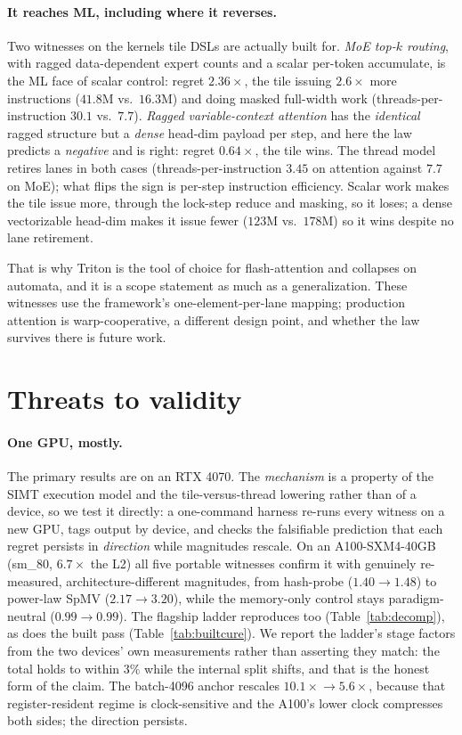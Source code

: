 \documentclass[sigplan,screen,review,anonymous]{acmart}
\begin{document}
\paragraph{It reaches ML, including where it reverses.} Two witnesses on the kernels tile
DSLs are actually built for. \emph{MoE top-$k$ routing}, with ragged data-dependent expert
counts and a scalar per-token accumulate, is the ML face of scalar control: regret
$2.36\times$, the tile issuing $2.6\times$ more instructions ($41.8$M vs.\ $16.3$M) and
doing masked full-width work (threads-per-instruction $30.1$ vs.\ $7.7$).
\emph{Ragged variable-context attention} has the \emph{identical} ragged structure but a
\emph{dense} head-dim payload per step, and here the law predicts a \emph{negative} and is
right: regret $0.64\times$, the tile wins. The thread model retires lanes in both cases
(threads-per-instruction $3.45$ on attention against $7.7$ on MoE); what flips the sign is
per-step instruction efficiency. Scalar work makes the tile issue
more, through the lock-step reduce and masking, so it loses; a dense vectorizable head-dim
makes it issue fewer ($123$M vs.\ $178$M) so it wins despite no lane retirement.

That is why Triton is the tool of choice for flash-attention and collapses on automata, and
it is a scope statement as much as a generalization. These witnesses use the framework's
one-element-per-lane mapping; production attention is warp-cooperative, a different design
point, and whether the law survives there is future work.

\section{Threats to validity}\label{sec:threats}

\paragraph{One GPU, mostly.} The primary results are on an RTX 4070. The \emph{mechanism}
is a property of the SIMT execution model and the tile-versus-thread lowering rather than
of a device, so we test it directly: a one-command harness re-runs every witness on a new
GPU, tags output by device, and checks the falsifiable prediction that each regret persists
in \emph{direction} while magnitudes rescale. On an A100-SXM4-40GB (sm\_80, $6.7\times$ the
L2) all five portable witnesses confirm it with genuinely re-measured, architecture-different
magnitudes, from hash-probe ($1.40\!\to\!1.48$) to power-law SpMV
($2.17\!\to\!3.20$), while the memory-only control stays paradigm-neutral
($0.99\!\to\!0.99$). The flagship ladder reproduces too
(Table~\ref{tab:decomp}), as does the built pass (Table~\ref{tab:builtcure}). We report
the ladder's stage factors from the two devices' own measurements rather than asserting
they match: the total holds to within $3\%$ while the internal split shifts, and that is
the honest form of the claim. The
batch-4096 anchor rescales $10.1\times\!\to\!5.6\times$, because that register-resident
regime is clock-sensitive and the A100's lower clock compresses both sides; the direction
persists.
\end{document}
